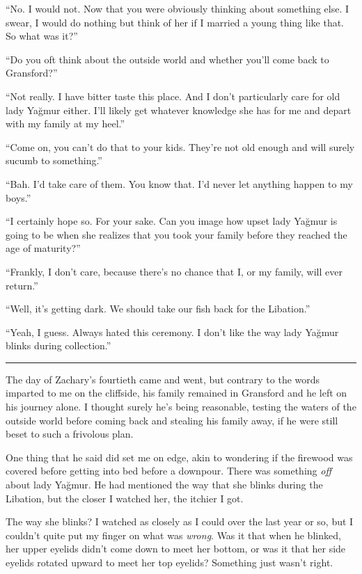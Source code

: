 ``No. I would not. Now that you were obviously thinking about something else. I swear, I would do
nothing but think of her if I married a young thing like that. So what was it?''

``Do you oft think about the outside world and whether you'll come back to Gransford?''

``Not really. I have bitter taste this place. And I don't particularly care for old lady Yağmur
either. I'll likely get whatever knowledge she has for me and depart with my family at my heel.''

``Come on, you can't do that to your kids. They're not old enough and will surely sucumb to
something.''

``Bah. I'd take care of them. You know that. I'd never let anything happen to my boys.''

``I certainly hope so. For your sake. Can you image how upset lady Yağmur is going to be when she
realizes that you took your family before they reached the age of maturity?''

``Frankly, I don't care, because there's no chance that I, or my family, will ever return.''

``Well, it's getting dark. We should take our fish back for the Libation.''

``Yeah, I guess. Always hated this ceremony. I don't like the way lady Yağmur blinks during
collection.''

\noindent\rule{\textwidth}{1pt}

The day of Zachary's fourtieth came and went, but contrary to the words imparted to me on the
cliffside, his family remained in Gransford and he left on his journey alone. I thought surely he's
being reasonable, testing the waters of the outside world before coming back and stealing his family
away, if he were still beset to such a frivolous plan.

One thing that he said did set me on edge, akin to wondering if the firewood was covered before
getting into bed before a downpour. There was something \textit{off} about lady Yağmur. He had
mentioned the way that she blinks during the Libation, but the closer I watched her,
the itchier I got.

The way she blinks? I watched as closely as I could over the last year or so, but I couldn't quite
put my finger on what was \textit{wrong}. Was it that when he blinked, her upper eyelids didn't come
down to meet her bottom, or was it that her side eyelids rotated upward to meet her top eyelids?
Something just wasn't right.

